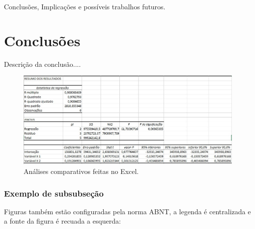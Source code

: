\documentclass[courier]{uninove-ppgi}
\begin{document}
        \begin{resumocapitulo}
            Conclusões, Implicações e possíveis trabalhos futuros.
        \end{resumocapitulo}
		
		\section{Conclusões}
		
		 Descrição da conclusão....
		 
	     \begin{figure}[ht!]
    
    	    \begin{center}
    	
    		    \includegraphics[scale=0.4]{WhatsApp Image 2021-06-24 at 05.51.07}
    	
    	    \end{center}
    	
    	    \caption{Análises comparativos feitas no Excel.}
    	
    	
    \end{figure}
     
    \subsubsection{Exemplo de subsubseção}
    
    Figuras também estão configuradas pela norma ABNT, a legenda é centralizada e a fonte da figura é recuada a esquerda:
    
\end{document}
